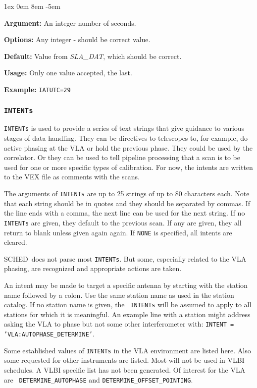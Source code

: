 \documentclass{report}
\newcommand{\schedb}{{\sc SCHED~}}
\newcommand{\rcwbox}[5]{
  \begin{list}{}{\parsep 1ex  \itemsep 0em
                 \leftmargin 8em  \itemindent -5em }
    \item {\bf Argument:} #1
    \item {\bf Options:}  #2
    \item {\bf Default:}  #3
    \item {\bf Usage:}    #4
    \item {\bf Example:}  #5
  \end{list}
}
\begin{document}
\rcwbox
{An integer number of seconds.}
{Any integer - should be correct value.}
{Value from {\sl SLA\_DAT}, which should be correct.}
{Only one value accepted, the last.}
{{\tt IATUTC=29}}


\subsubsection{\label{MP:INTENTs}{\tt INTENTs}}

{\tt INTENTs} is used to provide a series of text strings that give
guidance to various stages of data handling.  They can be directives
to telescopes to, for example, do active phasing at the VLA or hold
the previous phase.  They could be used by the correlator.  Or they can
be used to tell pipeline processing that a scan is to be used for one or
more specific types of calibration.  For now, the intents are written
to the VEX file as comments with the scans.

The arguments of {\tt INTENTs} are up to 25 strings of up to 80
characters each.  Note that each string should be in quotes and they
should be separated by commas.  If the line ends with a comma, the
next line can be used for the next string.  If no {\tt INTENTs} are
given, they default to the previous scan.  If any are given, they all
return to blank unless given again again.  If {\tt NONE} is specified,
all intents are cleared.

\schedb does not parse most {\tt INTENTs}.  But some, especially related
to the VLA phasing, are recognized and appropriate actions are taken.

An intent may be made to target a specific antenna by starting with
the station name followed by a colon.  Use the same station name as
used in the station catalog.  If no station name is given, the {\tt
INTENTs} will be assumed to apply to all stations for which it is
meaningful.  An example line with a station might address asking the
VLA to phase but not some other interferometer with: 
{\tt INTENT = 'VLA:AUTOPHASE\_DETERMINE'}.

Some established values of {\tt INTENTs} in the VLA environment are
listed here.  Also some requested for other instruments are listed.
Most will not be used in VLBI schedules.  A VLBI
specific list has not been generated.  Of interest for the VLA are {\tt
DETERMINE\_AUTOPHASE} and {\tt DETERMINE\_OFFSET\_POINTING}.  
\end{document}
